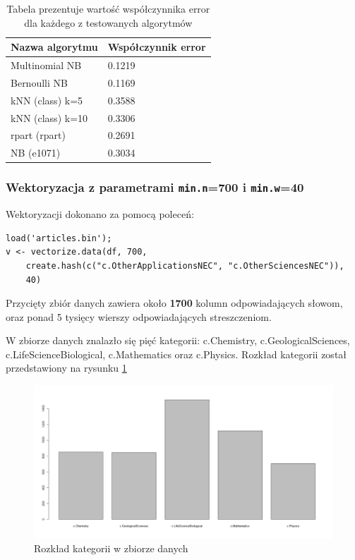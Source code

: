 \documentclass[a4paper,12pt]{article}
\begin{document}
		 \begin{table}	
		 	\centering	 	
		 	\begin{tabular}{|l|l|}
		 		\hline
		 		Nazwa algorytmu & Współczynnik error \\
		 		\hline
		 			Multinomial NB & 0.1219 \\
		 			Bernoulli NB & 0.1169 \\
		 		\hline
		 			kNN (class) k=5 & 0.3588 \\
		 			kNN (class) k=10 & 0.3306 \\
		 			rpart (rpart) & 0.2691 \\
					NB (e1071) & 0.3034 \\		 			
		 		\hline
		 	\end{tabular}
		 	\caption{Tabela prezentuje wartość współczynnika error dla
		 	każdego z testowanych algorytmów}
		 \end{table}
		 
		 \clearpage
		 
		 \subsubsection{Wektoryzacja z parametrami \texttt{min.n}=700 i
		 \texttt{min.w}=40}
		 
		 Wektoryzacji dokonano za pomocą poleceń:
		 \begin{verbatim}
load('articles.bin');
v <- vectorize.data(df, 700, 
	create.hash(c("c.OtherApplicationsNEC", "c.OtherSciencesNEC")),
	40) 
		 \end{verbatim}
		 
		 Przycięty zbiór danych zawiera około \textbf{1700} kolumn odpowiadających
		 słowom,
		 oraz ponad 5 tysięcy wierszy odpowiadających streszczeniom.
		 
		 W zbiorze danych znalazło się pięć kategorii: c.Chemistry, 		 
		 c.GeologicalSciences, c.LifeScienceBiological, c.Mathematics
		 oraz c.Physics. Rozkład kategorii został przedstawiony na 
		 rysunku \ref{fig:v2hist}
		 \begin{figure}[!h]
		 	\centering
		 		\includegraphics[width=\textwidth]{./img/v2_cats}
		 	\caption{Rozkład kategorii w zbiorze danych}
		 	\label{fig:v2hist}
		 \end{figure}
		 
\end{document}
